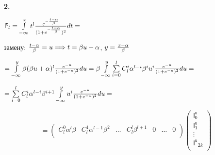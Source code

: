 \documentclass[a4paper,12pt]{article}
\begin{document}
\noindent\textbf{2.}

\begin{center}
    $\mathsf{I^t}_l = \int\limits_{-\infty}^x t^l {e^{-{t - \alpha\over{\beta}}}\over{(1 + e^{-{t - \alpha\over{\beta}}}})^2} d t = $
\end{center}

 замену: ${t - \alpha\over{\beta}} = u \Longrightarrow t = \beta u + \alpha$, $y = {x - \alpha\over{\beta}}$

\begin{center}
    $= \int\limits_{-\infty}^y \beta (\beta u + \alpha)^l {e^{-u}\over{(1 + e^{-u}})^2} d u = \beta \int\limits_{-\infty}^y \sum\limits_{i = 0}^l C_l^i \alpha^{l - i} \beta^i u^i {e^{-u}\over{(1 + e^{-u}})^2} d u = $
\end{center}

\begin{center}
    $= \sum\limits_{i = 0}^l C_l^i \alpha^{l - i} \beta^{i + 1}  \int\limits_{-\infty}^y u^i {e^{-u}\over{(1 + e^{-u}})^2} d u =$
\end{center}

\begin{displaymath}
    = \begin{pmatrix}
        C_l^0 \alpha^l \beta & C_l^1 \alpha^{l - 1} \beta^2 & \ldots & C_l^l \beta^{l + 1} & 0 & \ldots & 0 \\
    \end{pmatrix} \begin{pmatrix}
        \mathsf{I^u_0} \\ \mathsf{I^u_1} \\ \vdots \\ \mathsf{I^u}_{\mathsf{2}k} \\
    \end{pmatrix}
\end{displaymath}

\end{document}
